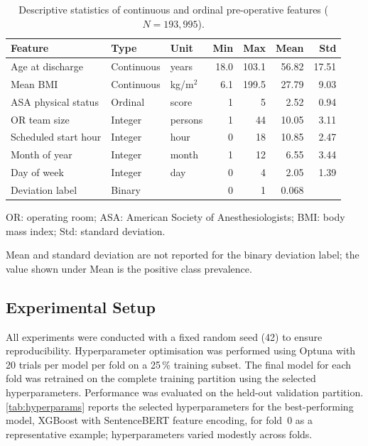 \begin{table}[ht]
\centering
\begin{threeparttable}
\caption{Descriptive statistics of continuous and ordinal pre-operative
         features ($N = 193{,}995$).}
\label{tab:data_stats}
\begin{tabular}{lllrrrr}
\toprule
Feature & Type & Unit & Min & Max & Mean & Std \\
\midrule
Age at discharge     & Continuous & years    & 18.0  & 103.1 & 56.82 & 17.51 \\
Mean BMI             & Continuous & kg/m$^2$ &  6.1  & 199.5 & 27.79 &  9.03 \\
ASA physical status  & Ordinal    & score    &  1    &   5   &  2.52 &  0.94 \\
OR team size         & Integer    & persons  &  1    &  44   & 10.05 &  3.11 \\
Scheduled start hour & Integer    & hour     &  0    &  18   & 10.85 &  2.47 \\
Month of year        & Integer    & month    &  1    &  12   &  6.55 &  3.44 \\
Day of week          & Integer    & day      &  0    &   4   &  2.05 &  1.39 \\
Deviation label      & Binary     &          &  0    &   1   & 0.068 &       \\
\bottomrule
\end{tabular}
\begin{tablenotes}
  \footnotesize
  \item OR: operating room; ASA: American Society of Anesthesiologists;
        BMI: body mass index; Std: standard deviation.
  \item Mean and standard deviation are not reported for the binary
        deviation label; the value shown under Mean is the positive
        class prevalence.
\end{tablenotes}
\end{threeparttable}
\end{table}

\subsection{Experimental Setup}
\label{sec:setup}

All experiments were conducted with a fixed random seed (42)
to ensure reproducibility.  Hyperparameter optimisation was performed using
Optuna with 20 trials per model per fold on a 25\,\% training subset.  The
final model for each fold was retrained on the complete training partition
using the selected hyperparameters.  Performance was evaluated on the held-out
validation partition.  \cref{tab:hyperparams} reports the selected
hyperparameters for the best-performing model, XGBoost with SentenceBERT
feature encoding, for fold~0 as a representative example; hyperparameters
varied modestly across folds.

